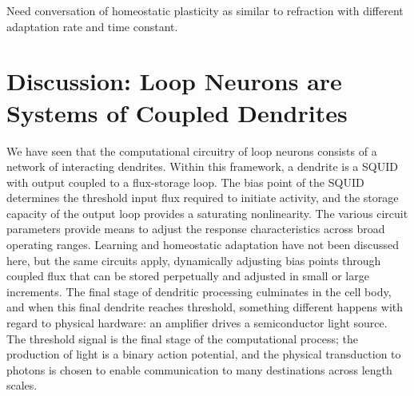\documentclass[twocolumn]{article}
\begin{document}

Need conversation of homeostatic plasticity as similar to refraction with different adaptation rate and time constant.

\section{\label{sec:discussion}Discussion: Loop Neurons are Systems of Coupled Dendrites}
We have seen that the computational circuitry of loop neurons consists of a network of interacting dendrites. Within this framework, a dendrite is a SQUID with output coupled to a flux-storage loop. The bias point of the SQUID determines the threshold input flux required to initiate activity, and the storage capacity of the output loop provides a saturating nonlinearity. The various circuit parameters provide means to adjust the response characteristics across broad operating ranges. Learning and homeostatic adaptation have not been discussed here, but the same circuits apply, dynamically adjusting bias points through coupled flux that can be stored perpetually and adjusted in small or large increments. The final stage of dendritic processing culminates in the cell body, and when this final dendrite reaches threshold, something different happens with regard to physical hardware: an amplifier drives a semiconductor light source. The threshold signal is the final stage of the computational process; the production of light is a binary action potential, and the physical transduction to photons is chosen to enable communication to many destinations across length scales. 
\end{document}
